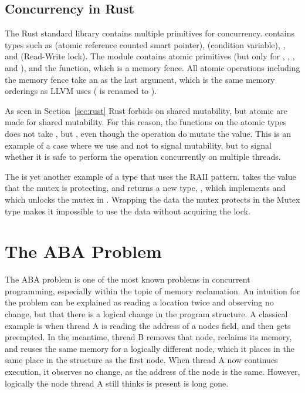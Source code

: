 \documentclass[b5paper]{report}
\begin{document}
\subsection{Concurrency in Rust}

The Rust standard library contains multiple primitives for concurrency.
 contains types such as  (atomic reference counted
smart pointer),  (condition variable), , and
 (Read-Write lock). The  module contains
atomic primitives (but only for , , , and
), and the  function, which is a memory fence. All atomic
operations including the memory fence take an  as the last
argument, which is the same memory orderings as LLVM uses ( is
renamed to ).

As seen in Section~\ref{sec:rust} Rust forbids on shared mutability, but atomic
are made for shared mutability. For this reason, the functions on the atomic
types does not take , but , even though the
operation do mutate the value. This is an example of a case where we use
 and \code{\&} not to signal mutability, but to signal whether it
is safe to perform the operation concurrently on multiple threads.

The  is yet another example of a type that uses the RAII pattern.
 takes the value that the mutex is protecting, and
 returns a new type, , which implements
 and which unlocks the mutex in . Wrapping the data
the mutex protects in the Mutex type makes it impossible to use the data without
acquiring the lock.


\section{The ABA Problem\label{sec:aba}}

The ABA problem is one of the most known problems in concurrent programming,
especially within the topic of memory reclamation. An intuition for the problem
can be explained as reading a location twice and observing no change, but that
there is a logical change in the program structure. A classical example is when
thread A is reading the address of a nodes  field, and then gets
preempted. In the meantime, thread B removes that  node, reclaims its
memory, and reuses the same memory for a logically different node, which it
places in the same place in the structure as the first node. When thread A now
continues execution, it observes no change, as the address of the 
node is the same. However, logically the node thread A still thinks is present
is long gone.
\end{document}

